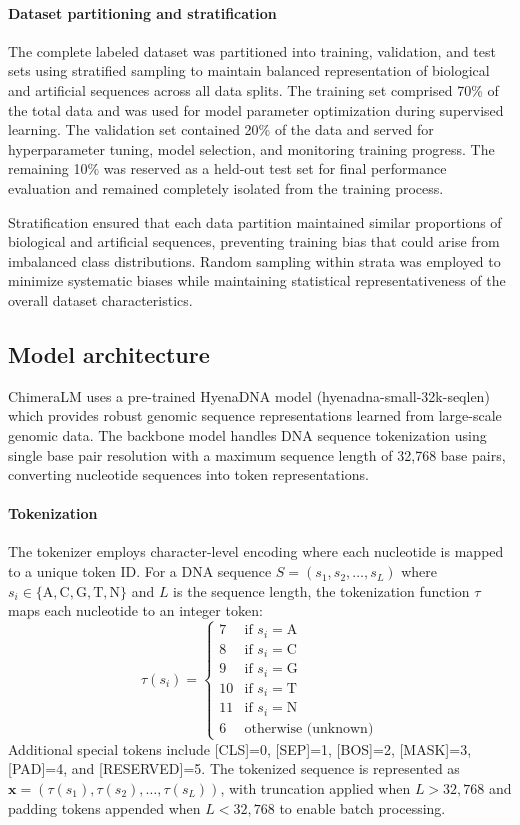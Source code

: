 \documentclass[pdflatex,sn-nature]{sn-jnl}%
\theoremstyle{thmstyleone}%
\theoremstyle{thmstyletwo}%
\theoremstyle{thmstylethree}%
\begin{document}
\paragraph{Dataset partitioning and stratification}
The complete labeled dataset was partitioned into training, validation, and test sets using stratified sampling to maintain balanced representation of biological and artificial sequences across all data splits.
The training set comprised 70\% of the total data and was used for model parameter optimization during supervised learning.
The validation set contained 20\% of the data and served for hyperparameter tuning, model selection, and monitoring training progress.
The remaining 10\% was reserved as a held-out test set for final performance evaluation and remained completely isolated from the training process.

Stratification ensured that each data partition maintained similar proportions of biological and artificial sequences, preventing training bias that could arise from imbalanced class distributions. Random sampling within strata was employed to minimize systematic biases while maintaining statistical representativeness of the overall dataset characteristics.

\subsection*{Model architecture}

ChimeraLM uses a pre-trained HyenaDNA model (hyenadna-small-32k-seqlen) which provides robust genomic sequence representations learned from large-scale genomic data.
The backbone model handles DNA sequence tokenization using single base pair resolution with a maximum sequence length of 32,768 base pairs, converting nucleotide sequences into token representations.

\paragraph{Tokenization}
The tokenizer employs character-level encoding where each nucleotide is mapped to a unique token ID.
For a DNA sequence $S = (s_1, s_2, \ldots, s_L)$ where $s_i \in \{\text{A}, \text{C}, \text{G}, \text{T}, \text{N}\}$ and $L$ is the sequence length, the tokenization function $\tau$ maps each nucleotide to an integer token:
$$
	\tau(s_i) = \begin{cases}
		7  & \text{if } s_i = \text{A}  \\
		8  & \text{if } s_i = \text{C}  \\
		9  & \text{if } s_i = \text{G}  \\
		10 & \text{if } s_i = \text{T}  \\
		11 & \text{if } s_i = \text{N}  \\
		6  & \text{otherwise (unknown)}
	\end{cases}
$$
Additional special tokens include [CLS]=0, [SEP]=1, [BOS]=2, [MASK]=3, [PAD]=4, and [RESERVED]=5.
The tokenized sequence is represented as $\mathbf{x} = (\tau(s_1), \tau(s_2), \ldots, \tau(s_L))$, with truncation applied when $L > 32{,}768$ and padding tokens appended when $L < 32{,}768$ to enable batch processing.
\end{document}
